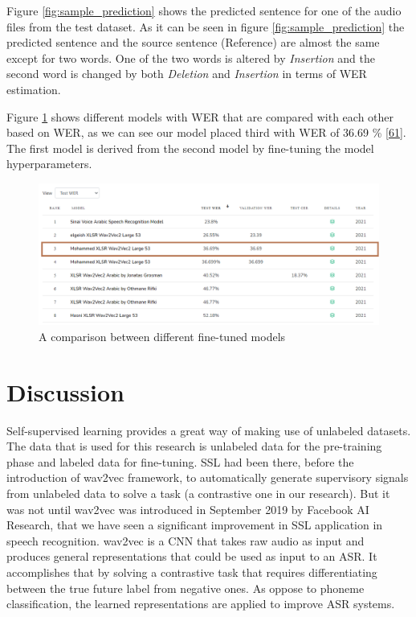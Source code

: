 \documentclass[
  a4paper,
]{article}
\begin{document}
Figure \ref{fig:sample_prediction} shows the predicted sentence for one
of the audio files from the test dataset. As it can be seen in figure
\ref{fig:sample_prediction} the predicted sentence and the source
sentence (Reference) are almost the same except for two words. One of
the two words is altered by \emph{Insertion} and the second word is
changed by both \emph{Deletion} and \emph{Insertion} in terms of WER
estimation.

Figure \ref{fig:wer_compared} shows different models with WER that are
compared with each other based on WER, as we can see our model placed
third with WER of 36.69 \%
\protect\hyperlink{ref-paperswithcode}{{[}61{]}}. The first model is
derived from the second model by fine-tuning the model hyperparameters.

\begin{figure}

{\centering \includegraphics{wer_compared} 

}

\caption{A comparison between different fine-tuned models}\label{fig:wer_compared}
\end{figure}

\newpage

\hypertarget{discussion}{%
\section{Discussion}\label{discussion}}

Self-supervised learning provides a great way of making use of unlabeled
datasets. The data that is used for this research is unlabeled data for
the pre-training phase and labeled data for fine-tuning. SSL had been
there, before the introduction of wav2vec framework, to automatically
generate supervisory signals from unlabeled data to solve a task (a
contrastive one in our research). But it was not until wav2vec was
introduced in September 2019 by Facebook AI Research, that we have seen
a significant improvement in SSL application in speech recognition.
wav2vec is a CNN that takes raw audio as input and produces general
representations that could be used as input to an ASR. It accomplishes
that by solving a contrastive task that requires differentiating between
the true future label from negative ones. As oppose to phoneme
classification, the learned representations are applied to improve ASR
systems.
\end{document}

